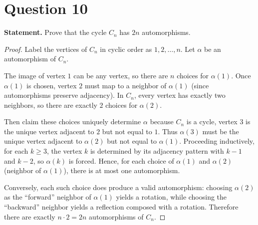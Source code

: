 \documentclass[11pt]{article}
\begin{document}
\newpage

\section*{Question 10}
\textbf{Statement.} Prove that the cycle $C_n$ has $2n$ automorphisms.

\begin{proof}
Label the vertices of $C_n$ in cyclic order as $1,2,\dots,n$.
Let $\alpha$ be an automorphism of $C_n$.

The image of vertex $1$ can be any vertex, so there are $n$ choices for $\alpha(1)$.
Once $\alpha(1)$ is chosen, vertex $2$ must map to a neighbor of $\alpha(1)$ (since automorphisms preserve adjacency).
In $C_n$, every vertex has exactly two neighbors, so there are exactly $2$ choices for $\alpha(2)$.

Then claim these choices uniquely determine $\alpha$ because $C_n$ is a cycle, vertex $3$ is the unique vertex adjacent to $2$ but not equal to $1$.
Thus $\alpha(3)$ must be the unique vertex adjacent to $\alpha(2)$ but not equal to $\alpha(1)$.
Proceeding inductively, for each $k\ge 3$, the vertex $k$ is determined by its adjacency pattern with $k-1$ and $k-2$, so $\alpha(k)$ is forced.
Hence, for each choice of $\alpha(1)$ and $\alpha(2)$ (neighbor of $\alpha(1)$), there is at most one automorphism.

Conversely, each such choice does produce a valid automorphism: choosing $\alpha(2)$ as the ``forward'' neighbor of $\alpha(1)$ yields a rotation, while choosing the ``backward'' neighbor yields a reflection composed with a rotation.
Therefore there are exactly $n\cdot 2 = 2n$ automorphisms of $C_n$.
\end{proof}

\end{document}
